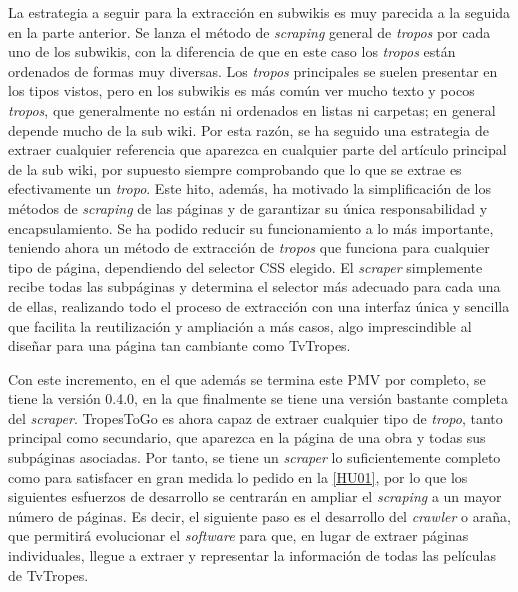 La estrategia a seguir para la extracción en subwikis es muy parecida a la
seguida en la parte anterior. Se lanza el método de \textit{scraping} general de
\textit{tropos} por cada uno de los subwikis, con la diferencia de que en este
caso los \textit{tropos} están ordenados de formas muy diversas. Los
\textit{tropos} principales se suelen presentar en los tipos vistos, pero en los
subwikis es más común ver mucho texto y pocos \textit{tropos}, que generalmente
no están ni ordenados en listas ni carpetas; en general depende mucho de la sub
wiki. Por esta razón, se ha seguido una estrategia de extraer cualquier
referencia que aparezca en cualquier parte del artículo principal de la sub
wiki, por supuesto siempre comprobando que lo que se extrae es efectivamente un
\textit{tropo}. Este hito, además, ha motivado la simplificación de los métodos
de \textit{scraping} de las páginas y de garantizar su única responsabilidad y
encapsulamiento. Se ha podido reducir su funcionamiento a lo más importante,
teniendo ahora un método de extracción de \textit{tropos} que funciona para
cualquier tipo de página, dependiendo del selector CSS elegido. El
\textit{scraper} simplemente recibe todas las subpáginas y determina el
selector más adecuado para cada una de ellas, realizando todo el proceso de
extracción con una interfaz única y sencilla que facilita la reutilización y
ampliación a más casos, algo imprescindible al diseñar para una página tan
cambiante como TvTropes.

Con este incremento, en el que además se termina este PMV por completo, se tiene
la versión 0.4.0, en la que finalmente se tiene una versión bastante completa
del \textit{scraper}. TropesToGo es ahora capaz de extraer cualquier tipo de
\textit{tropo}, tanto principal como secundario, que aparezca en la página de
una obra y todas sus subpáginas asociadas. Por tanto, se tiene un
\textit{scraper} lo suficientemente completo como para satisfacer en gran medida
lo pedido en la
\href{https://github.com/jlgallego99/TropesToGo/issues/6}{[HU01]}, por lo que
los siguientes esfuerzos de desarrollo se centrarán en ampliar el
\textit{scraping} a un mayor número de páginas. Es decir, el siguiente paso es
el desarrollo del \textit{crawler} o araña, que permitirá evolucionar el
\textit{software} para que, en lugar de extraer páginas individuales, llegue a
extraer y representar la información de todas las películas de TvTropes.

